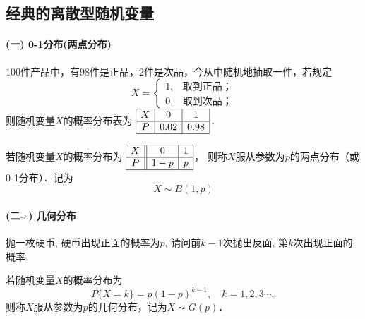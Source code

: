 \subsection{经典的离散型随机变量}

\paragraph{(一) 0-1分布(两点分布)}

\begin{example}
    $100$件产品中，有$98$件是正品，$2$件是次品，今从中随机地抽取一件，若规定
    \[X=\left\{ \begin{array}{ll} 1, & \text{取到正品；} \\
             0,      & \text{取到次品；}\end{array} \right.\]
    则随机变量$X$的概率分布表为
    $\begin{array}{|c|c|c|}\hline
            X & 0    & 1    \\ \hline
            P & 0.02 & 0.98 \\ \hline
        \end{array}$．
\end{example}

\begin{definition}[两点分布(0-1分布)]
    若随机变量$X$的概率分布为
    $\begin{array}{|c||c|c|}\hline
            X & 0   & 1 \\ \hline
            P & 1-p & p \\ \hline
        \end{array}$，
    则称$X$服从参数为$p$的两点分布（或 0-1分布）．记为$$X\sim B(1,p)$$
\end{definition}

\paragraph{(二-$\varepsilon$) 几何分布}

\begin{example}
    抛一枚硬币, 硬币出现正面的概率为$p$, 请问前$k-1$次抛出反面, 第$k$次出现正面的概率.
\end{example}

\begin{definition}
    若随机变量$X$的概率分布为
    \[P\{X=k\}=p(1-p)^{k-1},\quad k=1,2,3\cdots,\]
    则称$X$服从参数为$p$的几何分布，记为$X\sim G(p)$．
\end{definition}

